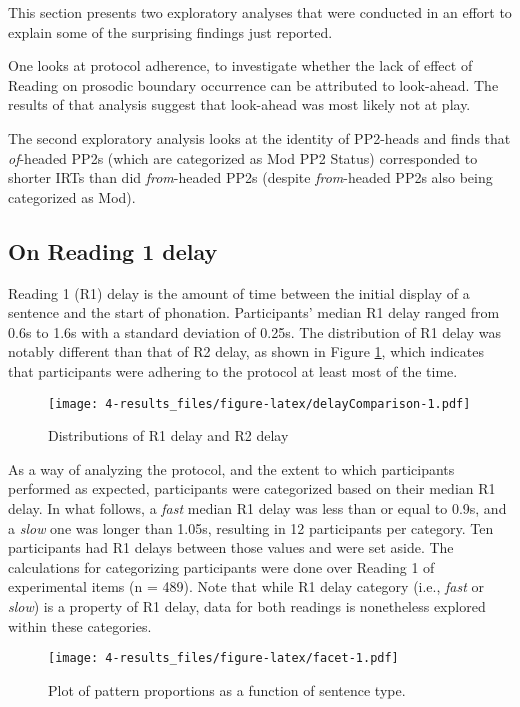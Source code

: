 \documentclass[11pt,oneside]{book}
\begin{document}
This section presents two exploratory analyses that were conducted in an effort to explain some of the surprising findings just reported.

One looks at protocol adherence, to investigate whether the lack of effect of Reading on prosodic boundary occurrence can be attributed to look-ahead. The results of that analysis suggest that look-ahead was most likely not at play.

The second exploratory analysis looks at the identity of PP2-heads and finds that \emph{of}-headed PP2s (which are categorized as Mod PP2 Status) corresponded to shorter IRTs than did \emph{from}-headed PP2s (despite \emph{from}-headed PP2s also being categorized as Mod).

\hypertarget{r1del}{%
\subsection{On Reading 1 delay}\label{r1del}}

Reading 1 (R1) delay is the amount of time between the initial display of a sentence and the start of phonation. Participants' median R1 delay ranged from 0.6s to 1.6s with a standard deviation of 0.25s. The distribution of R1 delay was notably different than that of R2 delay, as shown in Figure \ref{fig:delayComparison}, which indicates that participants were adhering to the protocol at least most of the time.

\begin{figure}
\centering
\texttt{[image: 4-results\_files/figure-latex/delayComparison-1.pdf]}
\caption{\label{fig:delayComparison}Distributions of R1 delay and R2 delay}
\end{figure}

As a way of analyzing the protocol, and the extent to which participants performed as expected, participants were categorized based on their median R1 delay. In what follows, a \emph{fast} median R1 delay was less than or equal to 0.9s, and a \emph{slow} one was longer than 1.05s, resulting in 12 participants per category. Ten participants had R1 delays between those values and were set aside. The calculations for categorizing participants were done over Reading 1 of experimental items (n = 489). Note that while R1 delay category (i.e., \emph{fast} or \emph{slow}) is a property of R1 delay, data for both readings is nonetheless explored within these categories.

\begin{figure}
\centering
\texttt{[image: 4-results\_files/figure-latex/facet-1.pdf]}
\caption{\label{fig:facet}Plot of pattern proportions as a function of sentence type.}
\end{figure}
\end{document}
